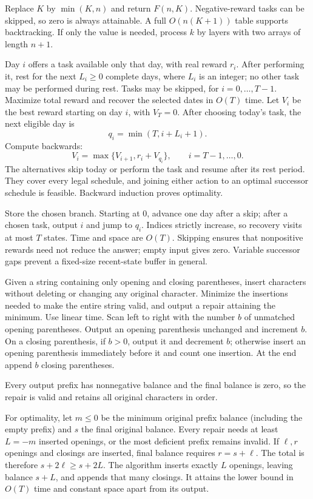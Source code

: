 Replace $K$ by $\min(K,n)$ and return $F(n,K)$. Negative-reward tasks can be skipped, so zero is always attainable. A full $O(n(K+1))$ table supports backtracking. If only the value is needed, process $k$ by layers with two arrays of length $n+1$.

Day $i$ offers a task available only that day, with real reward $r_i$. After performing it, rest for the next $L_i\ge0$ complete days, where $L_i$ is an integer; no other task may be performed during rest. Tasks may be skipped, for $i=0,\ldots,T-1$. Maximize total reward and recover the selected dates in $O(T)$ time.
\solution Let $V_i$ be the best reward starting on day $i$, with $V_T=0$. After choosing today's task, the next eligible day is
\[
q_i=\min(T,i+L_i+1).
\]
Compute backwards:
\[
V_i=\max\{V_{i+1},r_i+V_{q_i}\},\qquad i=T-1,\ldots,0.
\]
The alternatives skip today or perform the task and resume after its rest period. They cover every legal schedule, and joining either action to an optimal successor schedule is feasible. Backward induction proves optimality.

Store the chosen branch. Starting at 0, advance one day after a skip; after a chosen task, output $i$ and jump to $q_i$. Indices strictly increase, so recovery visits at most $T$ states. Time and space are $O(T)$. Skipping ensures that nonpositive rewards need not reduce the answer; empty input gives zero. Variable successor gaps prevent a fixed-size recent-state buffer in general.

Given a string containing only opening and closing parentheses, insert characters without deleting or changing any original character. Minimize the insertions needed to make the entire string valid, and output a repair attaining the minimum. Use linear time.
\solution Scan left to right with the number $b$ of unmatched opening parentheses. Output an opening parenthesis unchanged and increment $b$. On a closing parenthesis, if $b>0$, output it and decrement $b$; otherwise insert an opening parenthesis immediately before it and count one insertion. At the end append $b$ closing parentheses.

Every output prefix has nonnegative balance and the final balance is zero, so the repair is valid and retains all original characters in order.

For optimality, let $m\le0$ be the minimum original prefix balance (including the empty prefix) and $s$ the final original balance. Every repair needs at least $L=-m$ inserted openings, or the most deficient prefix remains invalid. If $\ell,r$ openings and closings are inserted, final balance requires $r=s+\ell$. The total is therefore $s+2\ell\ge s+2L$. The algorithm inserts exactly $L$ openings, leaving balance $s+L$, and appends that many closings. It attains the lower bound in $O(T)$ time and constant space apart from its output.


